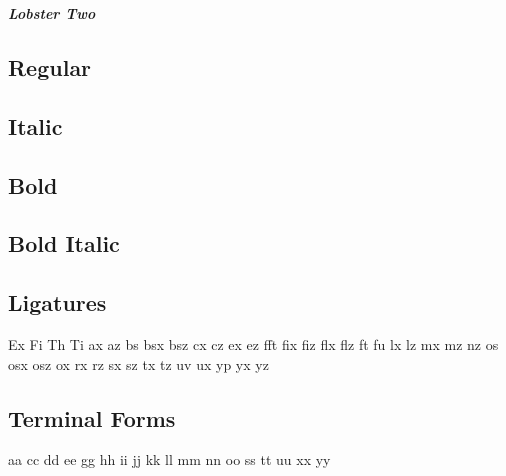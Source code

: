 \documentclass{article}
\begin{document}
\begin{center}\Huge\bf\it
Lobster Two
\end{center}
\subsection*{Regular}
\lipsum[1]

\subsection*{Italic}
\textit{\lipsum[2]}

\subsection*{Bold}
\textbf{\lipsum[3]}

\subsection*{Bold Italic}

\textbf{\textit{\lipsum[4]}}

\subsection*{Ligatures}\Huge\it

Ex
Fi
Th
Ti
ax
az
bs
bsx
bsz
cx
cz
ex
ez
fft
fix
fiz
flx
flz
ft
fu
lx
lz
mx
mz
nz
os
osx
osz
ox
rx
rz
sx
sz
tx
tz
uv
ux
yp
yx
yz

\subsection*{Terminal Forms}\Huge\it

aa cc dd ee gg hh ii jj kk ll mm nn oo  ss tt uu xx yy
\end{document}
